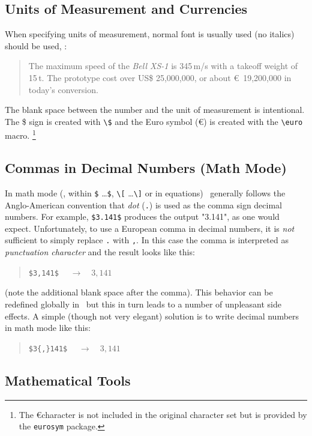\subsection{Units of Measurement and Currencies}

When specifying units of measurement, normal font is usually used (no italics) 
should be used, \eg:
%
\begin{quote}
	The maximum speed of the \textit{Bell XS-1} is 345\,m/s with a takeoff weight 
	of 15\,t. The prototype cost over US\$ 25,000,000, or about \euro\ 19,200,000 
	in today's conversion.
\end{quote}
%
The blank space between the number and the unit of measurement is intentional.
The \$ sign is created with \verb!\$! and the Euro symbol (\euro) is created
with the \verb!\euro! macro.%
\footnote{The \euro character is not included in the original \latex character
set but is provided by the \texttt{eurosym} package.}


\subsection{Commas in Decimal Numbers (Math Mode)}


In math mode (\ie, within \verb!$! \ldots \verb!$!, \verb!\[! \ldots \verb!\]! or 
in equations) \latex\ generally follows the Anglo-American convention that 
\emph{dot} (\verb!.!) is used as the comma sign decimal numbers.
For example, \verb!$3.141$! produces the output "3.141", as one would expect.
Unfortunately, to use a European comma in decimal numbers, it is \emph{not}
sufficient to simply replace \verb!.! with \verb!,!.
In this case the comma is interpreted as \emph{punctuation character} and 
the result looks like this:
%
\begin{quote}
	\verb!$3,141$! $\quad \rightarrow \quad 3,141$
\end{quote}
%
(note the additional blank space after the comma). This behavior can be
redefined globally in \latex\, but this in turn leads to a number of unpleasant
side effects. A simple (though not very elegant) solution is to write decimal
numbers in math mode like this:
%
\begin{quote}
	\verb!$3{,}141$! $\quad \rightarrow \quad 3{,}141$
\end{quote}


\subsection{Mathematical Tools}

